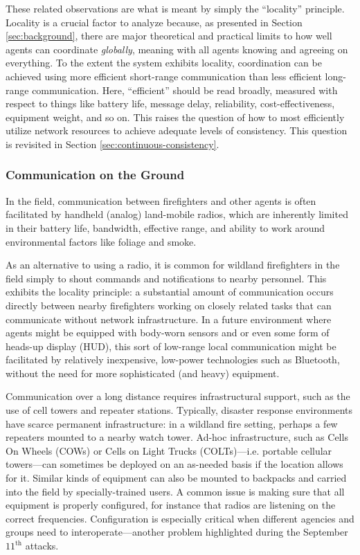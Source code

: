 \documentclass[]             %
{NASA}                       %
\theoremstyle{definition}
\begin{document}
These related observations are what is meant by simply the
``locality'' principle. Locality is a crucial factor to analyze
because, as presented in Section \ref{sec:background}, there are major
theoretical and practical limits to how well agents can coordinate
\emph{globally}, meaning with all agents knowing and agreeing on
everything. To the extent the system exhibits locality, coordination
can be achieved using more efficient short-range communication than
less efficient long-range communication. Here, ``efficient'' should be
read broadly, measured with respect to things like battery life,
message delay, reliability, cost-effectiveness, equipment weight, and
so on. This raises the question of how to most efficiently utilize
network resources to achieve adequate levels of consistency. This
question is revisited in Section \ref{sec:continuous-consistency}.

\subsubsection{Communication on the Ground}
\label{sssec:ground-communication}
In the field, communication between firefighters and other agents is
often facilitated by handheld (analog) land-mobile radios, which are
inherently limited in their battery life, bandwidth, effective range,
and ability to work around environmental factors like foliage and
smoke.

As an alternative to using a radio, it is common for wildland
firefighters in the field simply to shout commands and notifications
to nearby personnel. This exhibits the locality principle: a
substantial amount of communication occurs directly between nearby
firefighters working on closely related tasks that can communicate
without network infrastructure. In a future environment where agents
might be equipped with body-worn sensors and or even some form of
heads-up display (HUD), this sort of low-range local communication
might be facilitated by relatively inexpensive, low-power technologies
such as Bluetooth, without the need for more sophisticated (and heavy)
equipment.

Communication over a long distance requires infrastructural support,
such as the use of cell towers and repeater stations. Typically,
disaster response environments have scarce permanent infrastructure:
in a wildland fire setting, perhaps a few repeaters mounted to a
nearby watch tower. Ad-hoc infrastructure, such as Cells On Wheels
(COWs) or Cells on Light Trucks (COLTs)---i.e. portable cellular
towers---can sometimes be deployed on an as-needed basis if the
location allows for it. Similar kinds of equipment can also be mounted
to backpacks and carried into the field by specially-trained users. A
common issue is making sure that all equipment is properly configured,
for instance that radios are listening on the correct
frequencies. Configuration is especially critical when different
agencies and groups need to interoperate---another problem highlighted
during the September $11^\textrm{th}$ attacks.
\end{document}
